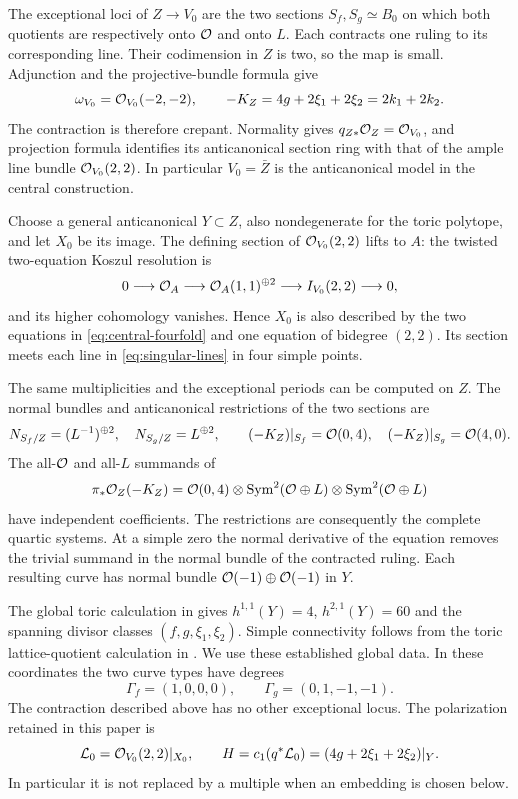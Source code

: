 The exceptional loci of $Z\to V_0$ are the two sections
$S_f,S_g\simeq B_0$ on which both quotients are respectively onto
$\mathcal O$ and onto $L$. Each contracts one ruling to its corresponding
line. Their codimension in $Z$ is two, so the map is small.
Adjunction and the projective-bundle formula give
\begin{equation}\label{eq:central-canonical}
 \omega_{V_0}=\mathcal O_{V_0}(-2,-2),\qquad
 -K_Z=4g+2\xi_1+2\xi_2=2k_1+2k_2.
\end{equation}
The contraction is therefore crepant. Normality gives
$q_{Z*}\mathcal O_Z=\mathcal O_{V_0}$, and projection formula identifies its
anticanonical section ring with that of the ample line bundle
$\mathcal O_{V_0}(2,2)$. In particular $V_0=\bar Z$ is the anticanonical
model in the central construction.

Choose a general anticanonical $Y\subset Z$, also nondegenerate for
the toric polytope, and let $X_0$ be its image. The defining section
of $\mathcal O_{V_0}(2,2)$ lifts to $A$: the twisted two-equation Koszul
resolution is
\[
 0\longrightarrow\mathcal O_A\longrightarrow\mathcal O_A(1,1)^{\oplus2}
      \longrightarrow I_{V_0}(2,2)\longrightarrow0,
\]
and its higher cohomology vanishes. Hence $X_0$ is also described
by the two equations in \eqref{eq:central-fourfold} and one equation
of bidegree $(2,2)$. Its section meets each line in
\eqref{eq:singular-lines} in four simple points.

The same multiplicities and the exceptional periods can be computed
on $Z$. The normal bundles and anticanonical restrictions of the two
sections are
\begin{equation}\label{eq:section-normals}
 N_{S_f/Z}=(L^{-1})^{\oplus2},\quad N_{S_g/Z}=L^{\oplus2},\qquad
 (-K_Z)|_{S_f}=\mathcal O(0,4),\quad
 (-K_Z)|_{S_g}=\mathcal O(4,0).
\end{equation}
The all-$\mathcal O$ and all-$L$ summands of
\[
 \pi_*\mathcal O_Z(-K_Z)=\mathcal O(0,4)\otimes
       \operatorname{Sym}^2(\mathcal O\oplus L)\otimes
       \operatorname{Sym}^2(\mathcal O\oplus L)
\]
have independent coefficients. The restrictions are consequently the
complete quartic systems. At a simple zero the normal derivative of
the equation removes the trivial summand in the normal bundle of the
contracted ruling. Each resulting curve has normal bundle
$\mathcal O(-1)\oplus\mathcal O(-1)$ in $Y$.

The global toric calculation in \cite[Appendix~A]{wuebben-chambers}
gives $h^{1,1}(Y)=4$, $h^{2,1}(Y)=60$ and the spanning divisor
classes $(f,g,\xi_1,\xi_2)$. Simple connectivity follows from the
toric lattice-quotient calculation in \cite[Section~8]{wuebben-hodge}.
We use these established global data. In these coordinates the two
curve types have degrees
\begin{equation}\label{eq:curve-types}
 \Gamma_f=(1,0,0,0),\qquad \Gamma_g=(0,1,-1,-1).
\end{equation}
The contraction described above has no other exceptional locus. The
polarization retained in this paper is
\begin{equation}\label{eq:polarization}
 \mathcal L_0=\mathcal O_{V_0}(2,2)|_{X_0},\qquad
 H=c_1(q^*\mathcal L_0)=(4g+2\xi_1+2\xi_2)|_Y.
\end{equation}
In particular it is not replaced by a multiple when an embedding is
chosen below.

